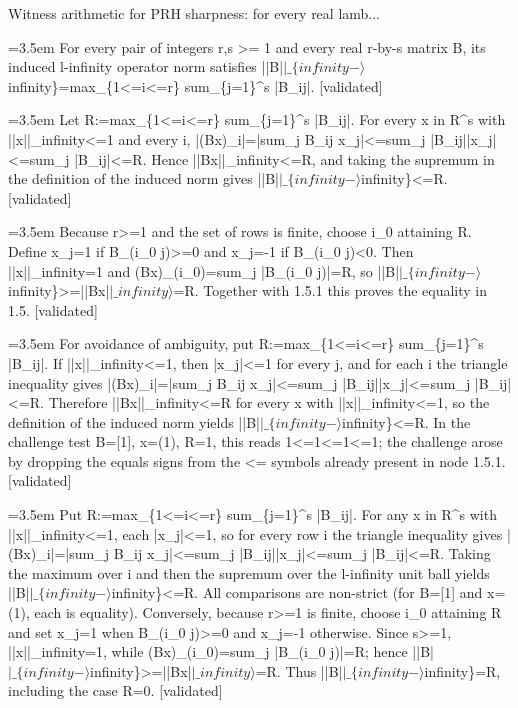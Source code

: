\documentclass{article}
\newcommand{\step}[1]{\par\noindent\hangindent=3.5em\hangafter=1%
  \makebox[3.5em][l]{\textbf{#1.}}}
\newcommand{\steptag}[1]{\hfill{\small\textsf{[#1]}}}
\begin{document}
\begin{proofbox}{Witness arithmetic for PRH sharpness: for every real lamb...}
\step{1.5} For every pair of integers r,s >= 1 and every real r-by-s matrix B, its induced l-infinity operator norm satisfies ||B|$|\_\{infinity-\rangle$infinity\}=max\_\{1<=i<=r\} sum\_\{j=1\}\textasciicircum{}s |B\_ij|. \steptag{validated} \\[6pt]
\step{1.5.1} Let R:=max\_\{1<=i<=r\} sum\_\{j=1\}\textasciicircum{}s |B\_ij|. For every x in R\textasciicircum{}s with ||x||\_infinity<=1 and every i, |(Bx)\_i|=|sum\_j B\_ij x\_j|<=sum\_j |B\_ij||x\_j|<=sum\_j |B\_ij|<=R. Hence ||Bx||\_infinity<=R, and taking the supremum in the definition of the induced norm gives ||B|$|\_\{infinity-\rangle$infinity\}<=R. \steptag{validated} \\[4pt]
\step{1.5.2} Because r>=1 and the set of rows is finite, choose i\_0 attaining R. Define x\_j=1 if B\_(i\_0 j)>=0 and x\_j=-1 if B\_(i\_0 j)<0. Then ||x||\_infinity=1 and (Bx)\_(i\_0)=sum\_j |B\_(i\_0 j)|=R, so ||B|$|\_\{infinity-\rangle$infinity\}>=||Bx|$|\_infinity\rangle$=R. Together with 1.5.1 this proves the equality in 1.5. \steptag{validated} \\[4pt]
\step{1.5.3} For avoidance of ambiguity, put R:=max\_\{1<=i<=r\} sum\_\{j=1\}\textasciicircum{}s |B\_ij|. If ||x||\_infinity<=1, then |x\_j|<=1 for every j, and for each i the triangle inequality gives |(Bx)\_i|=|sum\_j B\_ij x\_j|<=sum\_j |B\_ij||x\_j|<=sum\_j |B\_ij|<=R. Therefore ||Bx||\_infinity<=R for every x with ||x||\_infinity<=1, so the definition of the induced norm yields ||B|$|\_\{infinity-\rangle$infinity\}<=R. In the challenge test B=[1], x=(1), R=1, this reads 1<=1<=1<=1; the challenge arose by dropping the equals signs from the <= symbols already present in node 1.5.1. \steptag{validated} \\[4pt]
\step{1.5.4} Put R:=max\_\{1<=i<=r\} sum\_\{j=1\}\textasciicircum{}s |B\_ij|. For any x in R\textasciicircum{}s with ||x||\_infinity<=1, each |x\_j|<=1, so for every row i the triangle inequality gives |(Bx)\_i|=|sum\_j B\_ij x\_j|<=sum\_j |B\_ij||x\_j|<=sum\_j |B\_ij|<=R. Taking the maximum over i and then the supremum over the l-infinity unit ball yields ||B|$|\_\{infinity-\rangle$infinity\}<=R. All comparisons are non-strict (for B=[1] and x=(1), each is equality). Conversely, because r>=1 is finite, choose i\_0 attaining R and set x\_j=1 when B\_(i\_0 j)>=0 and x\_j=-1 otherwise. Since s>=1, ||x||\_infinity=1, while (Bx)\_(i\_0)=sum\_j |B\_(i\_0 j)|=R; hence ||B|$|\_\{infinity-\rangle$infinity\}>=||Bx|$|\_infinity\rangle$=R. Thus ||B|$|\_\{infinity-\rangle$infinity\}=R, including the case R=0. \steptag{validated} \\[4pt]

\end{proofbox}
\end{document}
